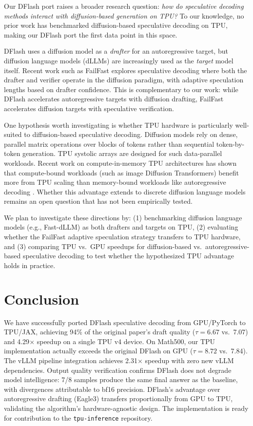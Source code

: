 \documentclass[12pt,letterpaper]{article}
\begin{document}
Our DFlash port raises a broader research question: \textit{how do speculative decoding methods interact with diffusion-based generation on TPU?} To our knowledge, no prior work has benchmarked diffusion-based speculative decoding on TPU, making our DFlash port the first data point in this space.

DFlash uses a diffusion model as a \emph{drafter} for an autoregressive target, but diffusion language models (dLLMs) are increasingly used as the \emph{target} model itself. Recent work such as FailFast \citep{pan2026failfastwinbig} explores speculative decoding where both the drafter and verifier operate in the diffusion paradigm, with adaptive speculation lengths based on drafter confidence. This is complementary to our work: while DFlash accelerates autoregressive targets with diffusion drafting, FailFast accelerates diffusion targets with speculative verification.

One hypothesis worth investigating is whether TPU hardware is particularly well-suited to diffusion-based speculative decoding. Diffusion models rely on dense, parallel matrix operations over blocks of tokens rather than sequential token-by-token generation. TPU systolic arrays are designed for such data-parallel workloads. Recent work on compute-in-memory TPU architectures has shown that compute-bound workloads (such as image Diffusion Transformers) benefit more from TPU scaling than memory-bound workloads like autoregressive decoding \citep{wang2025acceleratinglargelanguagemodel}. Whether this advantage extends to discrete diffusion language models remains an open question that has not been empirically tested.

We plan to investigate these directions by: (1) benchmarking diffusion language models (e.g., Fast-dLLM) as both drafters and targets on TPU, (2) evaluating whether the FailFast adaptive speculation strategy transfers to TPU hardware, and (3) comparing TPU vs.\ GPU speedups for diffusion-based vs.\ autoregressive-based speculative decoding to test whether the hypothesized TPU advantage holds in practice.


\section{Conclusion}

We have successfully ported DFlash speculative decoding from GPU/PyTorch to TPU/JAX, achieving 94\% of the original paper's draft quality ($\tau=6.67$ vs.\ 7.07) and 4.29$\times$ speedup on a single TPU v4 device. On Math500, our TPU implementation actually exceeds the original DFlash on GPU ($\tau=8.72$ vs.\ 7.84). The vLLM pipeline integration achieves 2.31$\times$ speedup with zero new vLLM dependencies. Output quality verification confirms DFlash does not degrade model intelligence: 7/8 samples produce the same final answer as the baseline, with divergences attributable to bf16 precision. DFlash's advantage over autoregressive drafting (Eagle3) transfers proportionally from GPU to TPU, validating the algorithm's hardware-agnostic design. The implementation is ready for contribution to the \texttt{tpu-inference} repository.
\end{document}
